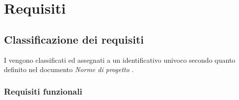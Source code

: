 \documentclass[AnalisiDeiRequisiti.tex]{subfiles}
\begin{document}

\chapter{Requisiti}
\section{Classificazione dei requisiti}
I  vengono classificati ed assegnati a un identificativo univoco secondo quanto definito nel documento \textit{Norme di progetto \vrdue}.

\subsection{Requisiti funzionali}
\end{document}
